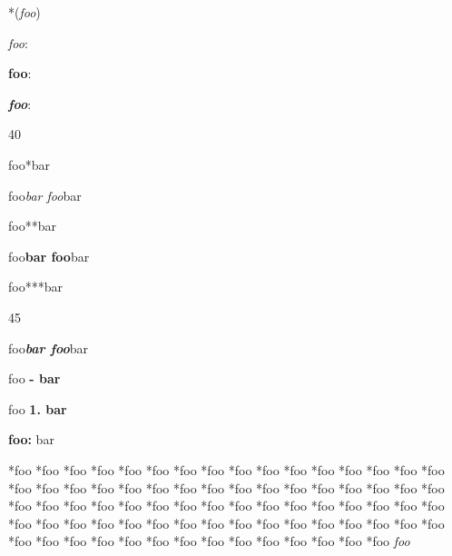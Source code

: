 *(\emph{foo})

\emph{foo}:

\textbf{foo}:

\textbf{\emph{foo}}:

40

foo*bar

foo\emph{bar foo}bar

foo**bar

foo\textbf{bar foo}bar

foo***bar

45

foo\textbf{\emph{bar foo}}bar

foo \textbf{- bar}

foo \textbf{1. bar}

\textbf{foo:} bar

*foo
*foo
*foo
*foo
*foo
*foo
*foo
*foo
*foo
*foo
*foo
*foo
*foo
*foo
*foo
*foo
*foo
*foo
*foo
*foo
*foo
*foo
*foo
*foo
*foo
*foo
*foo
*foo
*foo
*foo
*foo
*foo
*foo
*foo
*foo
*foo
*foo
*foo
*foo
*foo
*foo
*foo
*foo
*foo
*foo
*foo
*foo
*foo
*foo
*foo
*foo
*foo
*foo
*foo
*foo
*foo
*foo
*foo
*foo
*foo
*foo
*foo
*foo
*foo
*foo
*foo
*foo
*foo
*foo
*foo
*foo
*foo
*foo
*foo
*foo
*foo
*foo
*foo
\emph{foo}
